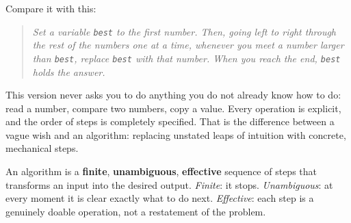 Compare it with this:

\begin{quote}
\emph{Set a variable \texttt{best} to the first number. Then, going left to right
through the rest of the numbers one at a time, whenever you meet a number larger
than \texttt{best}, replace \texttt{best} with that number. When you reach the end,
\texttt{best} holds the answer.}
\end{quote}

This version never asks you to do anything you do not already know how to do:
read a number, compare two numbers, copy a value. Every operation is explicit,
and the order of steps is completely specified. That is the difference between a
vague wish and an algorithm: replacing unstated leaps of intuition with concrete,
mechanical steps.

\begin{focusbox}
An algorithm is a \textbf{finite}, \textbf{unambiguous}, \textbf{effective}
sequence of steps that transforms an input into the desired output.
\emph{Finite}: it stops. \emph{Unambiguous}: at every moment it is clear exactly
what to do next. \emph{Effective}: each step is a genuinely doable operation, not a
restatement of the problem.
\end{focusbox}

